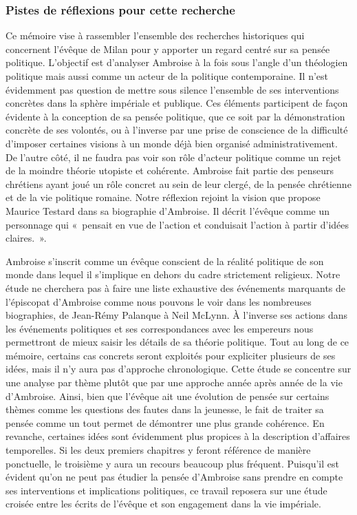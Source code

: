 \bigskip

\subsubsection*{Pistes de réflexions pour cette recherche}

Ce mémoire vise à rassembler l'ensemble des recherches historiques qui concernent l'évêque de Milan pour y apporter un regard centré sur sa pensée politique. L'objectif est d'analyser Ambroise à la fois sous l'angle d'un théologien politique mais aussi comme un acteur de la politique contemporaine. Il n'est évidemment pas question de mettre sous silence l'ensemble de ses interventions concrètes dans la sphère impériale et publique. Ces éléments participent de façon évidente à la conception de sa pensée politique, que ce soit par la démonstration concrète de ses volontés, ou à l'inverse par une prise de conscience de la difficulté d'imposer certaines visions à un monde déjà bien organisé administrativement. De l'autre côté, il ne faudra pas voir son rôle d'acteur politique comme un rejet de la moindre théorie utopiste et cohérente. Ambroise fait partie des penseurs chrétiens ayant joué un rôle concret au sein de leur clergé, de la pensée chrétienne et de la vie politique romaine. Notre réflexion rejoint la vision que propose Maurice Testard dans sa biographie d'Ambroise. Il décrit l'évêque comme un personnage qui «~pensait en vue de l’action et conduisait l’action à partir d’idées claires.~»\autocite[392]{testard_ambroise_1992}.

\bigskip

Ambroise s'inscrit comme un évêque conscient de la réalité politique de son monde dans lequel il s'implique en dehors du cadre strictement religieux. Notre étude ne cherchera pas à faire une liste exhaustive des événements marquants de l'épiscopat d'Ambroise comme nous pouvons le voir dans les nombreuses biographies, de Jean-Rémy Palanque à Neil McLynn. À l'inverse ses actions dans les événements politiques et ses correspondances avec les empereurs nous permettront de mieux saisir les détails de sa théorie politique. Tout au long de ce mémoire, certains cas concrets seront exploités pour expliciter plusieurs de ses idées, mais il n'y aura pas d'approche chronologique. Cette étude se concentre sur une analyse par thème plutôt que par une approche année après année de la vie d'Ambroise. Ainsi, bien que l'évêque ait une évolution de pensée sur certains thèmes comme les questions des fautes dans la jeunesse, le fait de traiter sa pensée comme un tout permet de démontrer une plus grande cohérence. En revanche, certaines idées sont évidemment plus propices à la description d'affaires temporelles. Si les deux premiers chapitres y feront référence de manière ponctuelle, le troisième y aura un recours beaucoup plus fréquent. Puisqu'il est évident qu'on ne peut pas étudier la pensée d'Ambroise sans prendre en compte ses interventions et implications politiques, ce travail reposera sur une étude croisée entre les écrits de l'évêque et son engagement dans la vie impériale.

